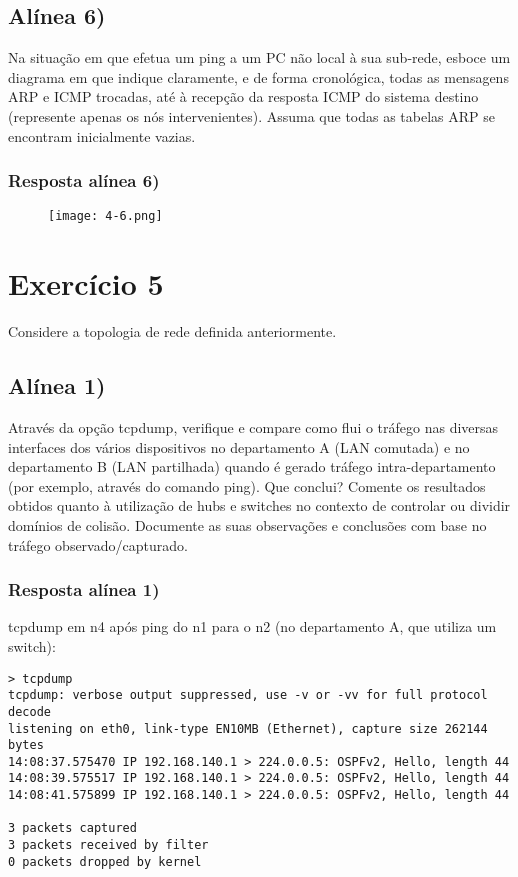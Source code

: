 \documentclass{article}
\begin{document}
\subsection{Alínea 6)}
Na situação em que efetua um ping a um PC não local à sua sub-rede, esboce um diagrama em que indique claramente, e de forma cronológica, todas as mensagens ARP e ICMP trocadas, até à recepção da resposta ICMP do sistema destino (represente apenas os nós intervenientes). Assuma que todas as tabelas ARP se encontram inicialmente vazias.
\pagebreak

\subsubsection{Resposta alínea 6)}

\begin{figure}[h]
    \centering
    \texttt{[image: 4-6.png]}
\end{figure}


\pagebreak

\section{Exercício 5}

Considere a topologia de rede definida anteriormente.

\subsection{Alínea 1)}
Através da opção tcpdump, verifique e compare como flui o tráfego nas diversas interfaces dos vários dispositivos no departamento A (LAN comutada) e no departamento B (LAN partilhada) quando é gerado tráfego intra-departamento (por exemplo, através do comando ping). Que conclui?
Comente os resultados obtidos quanto à utilização de hubs e switches no contexto de controlar ou dividir domínios de colisão. Documente as suas observações e conclusões com base no tráfego observado/capturado.

\subsubsection{Resposta alínea 1)}

tcpdump em n4 após ping do n1 para o n2 (no departamento A, que utiliza um switch):
\begin{lstlisting}
> tcpdump
tcpdump: verbose output suppressed, use -v or -vv for full protocol decode
listening on eth0, link-type EN10MB (Ethernet), capture size 262144 bytes
14:08:37.575470 IP 192.168.140.1 > 224.0.0.5: OSPFv2, Hello, length 44
14:08:39.575517 IP 192.168.140.1 > 224.0.0.5: OSPFv2, Hello, length 44
14:08:41.575899 IP 192.168.140.1 > 224.0.0.5: OSPFv2, Hello, length 44

3 packets captured
3 packets received by filter
0 packets dropped by kernel
\end{lstlisting}
\end{document}
